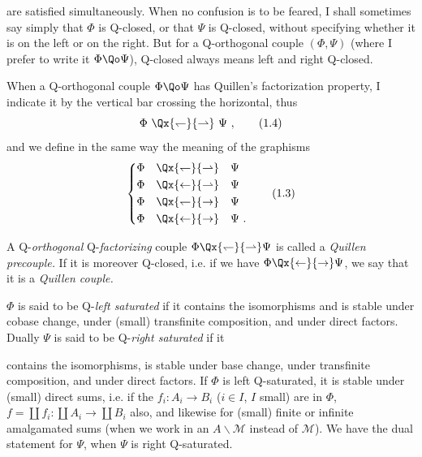 
are satisfied simultaneously. When no confusion is to be feared, I shall sometimes say simply that $\Phi$ is Q-closed, or that $\Psi$ is Q-closed, without specifying whether it is on the left or %
on the right. But for a Q-orthogonal couple $(\Phi, \Psi)$ (where I prefer to write it $\Phi \Qo \Psi$), Q-closed %
always means left and right Q-closed.

When a Q-orthogonal couple $\Phi \Qo \Psi$ has Quillen's factorization property, I indicate it by the vertical bar crossing the horizontal, thus
\[
\Phi \ \Qx{\leftharpoondown}{\rightharpoonup} \ \Psi\ ,
\tag*{(1.4)}
\]
and we define in the same way the meaning of the graphisms
\[
\left\{
\begin{aligned}
&\Phi \quad \Qx{\leftharpoondown}{\rightharpoonup} \quad \Psi\\
&\Phi \quad \Qx{\leftarrow}{\rightharpoonup} \quad \Psi\\
&\Phi \quad \Qx{\leftharpoondown}{\rightarrow} \quad \Psi\\
&\Phi \quad \Qx{\leftarrow}{\rightarrow} \quad \Psi\ .
\end{aligned}
\right.
\tag*{(1.3)} %
\]

\newpage


A Q-\textit{orthogonal} Q-\textit{factorizing} couple $\Phi \Qx{\leftharpoondown}{\rightharpoonup} \Psi$ is called a \textit{Quillen precouple.} If it is moreover Q-closed, i.e. if we have $\Phi \Qx{\leftarrow}{\rightarrow} \Psi$, we say that it is a \textit{Quillen couple.}

$\Phi$ is said to be Q-\textit{left saturated} if it contains the isomorphisms and is stable under cobase change, under (small) transfinite composition, and under direct factors. Dually $\Psi$ is said to be Q-\textit{right saturated} if it


contains the isomorphisms, is stable under base change, under transfinite composition, and under direct factors. If $\Phi$ is left Q-saturated, it is stable under (small) direct sums, i.e. if the $f_i : A_i \longrightarrow B_i$ ($i \in I$, $I$ small) are in $\Phi$, $f = \coprod f_i : \coprod A_i \longrightarrow \coprod B_i$ also, and likewise for (small) finite or infinite amalgamated sums (when we work in an $A\backslash\mathcal{M}$ instead of $\mathcal{M}$). We have the dual statement for $\Psi$, when $\Psi$ is right Q-saturated.


